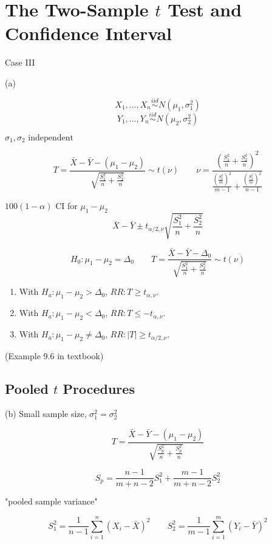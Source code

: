 \section{The Two-Sample $t$ Test and Confidence Interval}
Case III

(a) 

\[X_1,\dots,X_n \overset{iid}{\sim} N(\mu_1,\sigma_1^2)\]
\[Y_1,\dots,Y_n \overset{iid}{\sim} N(\mu_2,\sigma_2^2)\] 

$\sigma_1,\sigma_2 \text{ independent} $

\[T=\frac{\bar{X}-\bar{Y}-(\mu_1-\mu_2)}{\sqrt{\frac{S_1^2}{n}+\frac{S_2^2}{n}}} \sim t(\nu) \qquad \nu=\frac{\left( \frac{S_1^2}{n}+\frac{S_2^2}{n} \right)^2}{ \frac{\left( \frac{S_1^2}{m} \right)^2}{m-1}+ \frac{\left( \frac{S_1^2}{m} \right)^2}{n-1}  } \]

$100(1-\alpha)$ CI for $\mu_1-\mu_2$
\[\bar{X}-\bar{Y} \pm t_{\alpha/2,\nu} \sqrt{\frac{S_1^2}{n}+\frac{S_2^2}{n}}  \]

\[H_0:\mu_1-\mu_2=\Delta_0 \qquad T=\frac{\bar{X}-\bar{Y}-\Delta_0}{\sqrt{\frac{S_1^2}{n}+\frac{S_2^2}{n}}} \sim t(\nu)\]
\begin{enumerate}
\item With $H_a: \mu_1-\mu_2>\Delta_0$, $RR:T\geq t_{\alpha,\nu}$.
\item With $H_a: \mu_1-\mu_2<\Delta_0$, $RR:T\leq -t_{\alpha,\nu}$.
\item With $H_a: \mu_1-\mu_2\neq\Delta_0$, $RR:|T|\geq t_{\alpha/2,\nu}$.
\end{enumerate}

\begin{exmp}
(Example 9.6 in textbook)
\end{exmp}

\subsection{Pooled $t$ Procedures}
(b) Small sample size, $\sigma_1^2=\sigma_2^2$

\[T=\frac{\bar{X}-\bar{Y}-(\mu_1-\mu_2)}{\sqrt{\frac{S_p^2}{n}+\frac{S_p^2}{n}}}\]

\[S_p=\frac{n-1}{m+n-2}S_1^2+\frac{m-1}{m+n-2}S_2^2\]

"pooled sample variance"

\[S_1^2=\frac{1}{n-1} \sum_{i=1}^n (X_i-\bar{X})^2 \qquad S_2^2=\frac{1}{m-1} \sum_{i=1}^m (Y_i-\bar{Y})^2 \]

